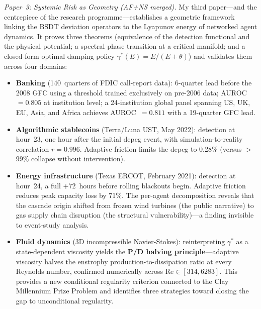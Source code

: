 \documentclass[12pt,a4paper]{article}
\begin{document}
\textit{Paper~3: Systemic Risk as Geometry (AF+NS merged).}\;
My third paper---and the centrepiece of the research programme---establishes
a geometric framework linking the BSDT deviation operators to the
Lyapunov energy of networked agent dynamics.  It proves three theorems
(equivalence of the detection functional and the physical potential;
a spectral phase transition at a critical manifold; and a closed-form
optimal damping policy $\gamma^*(E) = E/(E+\theta)$) and validates
them across four domains:

\begin{itemize}[nosep, leftmargin=2em]
  \item \textbf{Banking} (140~quarters of FDIC call-report data):
    6-quarter lead before the 2008 GFC using a threshold trained
    exclusively on pre-2006 data; AUROC~$= 0.805$ at institution level;
    a 24-institution global panel spanning US, UK, EU, Asia, and Africa
    achieves AUROC~$= 0.811$ with a 19-quarter GFC lead.

  \item \textbf{Algorithmic stablecoins} (Terra/Luna UST, May 2022):
    detection at hour~23, one hour after the initial depeg event,
    with simulation-to-reality correlation $r = 0.996$.  Adaptive
    friction limits the depeg to 0.28\% (versus $>$99\% collapse
    without intervention).

  \item \textbf{Energy infrastructure} (Texas ERCOT, February 2021):
    detection at hour~24, a full $+$72~hours before rolling blackouts
    begin.  Adaptive friction reduces peak capacity loss by 71\%.
    The per-agent decomposition reveals that the cascade origin shifted
    from frozen wind turbines (the public narrative) to gas supply chain
    disruption (the structural vulnerability)---a finding invisible to
    event-study analysis.

  \item \textbf{Fluid dynamics} (3D incompressible Navier-Stokes):
    reinterpreting $\gamma^*$ as a state-dependent viscosity yields the
    \textbf{P/D halving principle}---adaptive viscosity halves the enstrophy
    production-to-dissipation ratio at every Reynolds number, confirmed
    numerically across $\mathrm{Re} \in [314, 6283]$.  This provides a
    new conditional regularity criterion connected to the Clay Millennium
    Prize Problem and identifies three strategies toward closing the gap
    to unconditional regularity.
\end{itemize}
\end{document}
